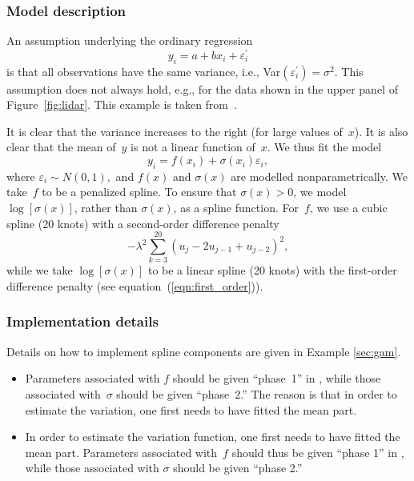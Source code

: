 \documentclass{admbmanual}
\newcommand{\citeasnoun}{\cite}
\begin{document}
\subsubsection{Model description}
An assumption underlying the ordinary regression
\[
y_{i}=a+bx_{i}+\varepsilon _{i}^{\prime }
\]
is that all observations have the same variance, i.e.,
Var$\left( \varepsilon_{i}^{\prime }\right) =\sigma^{2}$. This assumption does
not always hold, e.g., for the data shown in the upper panel of
Figure~\ref{fig:lidar}. This example is taken
from~\citeasnoun{rupp:wand:carr:2003}.

It is clear that the variance increases to the right (for large values of~$x$).
It is also clear that the mean of~$y$ is not a linear function of~$x$. We thus
fit the model
\[
y_{i}=f(x_{i})+\sigma (x_{i})\varepsilon _{i},
\]
where $\varepsilon _{i}\sim N(0,1),$ and $f(x)$ and $\sigma (x)$ are modelled
nonparametrically. We take~$f$ to be a penalized spline. To ensure that $\sigma
(x)>0$, we model $\log \left[ \sigma (x)\right] $, rather than $\sigma (x)$, as
a spline function. For~$f$, we use a cubic spline (20 knots) with a second-order
difference penalty%
\[
-\lambda ^{2}\sum_{k=3}^{20}\left( u_{j}-2u_{j-1}+u_{j-2}\right) ^{2},
\]
while we take $\log \left[ \sigma (x)\right]$ to be a linear spline (20 knots)
with the first-order difference penalty (see equation~(\ref{eqn:first_order})).

\subsubsection{Implementation details}

Details on how to implement spline components are given in Example
\ref{sec:gam}.

\begin{itemize}
  \item Parameters associated with $f$ should be given ``phase~1'' in \scAB,
  while those associated with~$\sigma $ should be given ``phase~2.'' The reason
  is that in order to estimate the variation, one first needs to have fitted the
  mean part.

  \item In order to estimate the variation function, one first needs to have
  fitted the mean part. Parameters associated with~$f$ should thus be given
  ``phase 1'' in \scAB, while those associated with $\sigma$ should be given
  ``phase 2.''
\end{itemize}
\end{document}
